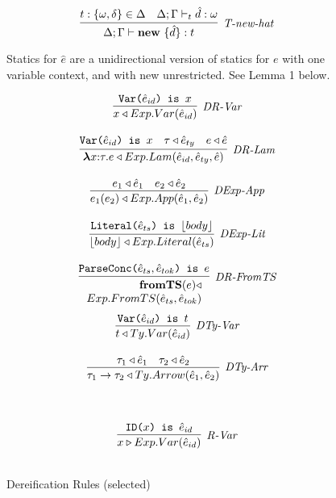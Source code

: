 \begin{figure}
\centering
\[
\infer[\textit{T-new-hat}]
	{\Delta; \Gamma \vdash \keyw{new}\ \{ \hat d \} :  t }
	{ t:\{\omega, \delta\} \in \Delta & \Delta; \Gamma \vdash_t \hat d : \omega}
\]
\vspace{-15px}
\caption{Statics for $\hat e$ are a unidirectional version of statics for $e$ with one variable context, and with new unrestricted. See Lemma 1 below.}
\vspace{-10px}
\label{fig:staticsHat}
\end{figure}

\begin{figure}[t]
\centering
\begin{minipage}[t]{.51\textwidth}
  \centering
   \[
\begin{array}{c}

\infer[\textit{DR-Var}]
	{ x \triangleleft Exp.Var(\hat{e}_{id})   }
	{ \texttt{Var($\hat{e}_{id}$) is $x$}} \\[3ex]

\infer[\textit{DR-Lam}]
	{ \boldsymbol\lambda x{:}\tau . e \triangleleft Exp.Lam( \hat{e}_{id}, \hat{e}_{ty}, \hat{e})  }
	{ \texttt{Var($\hat{e}_{id}$) is $x$} & \tau \triangleleft \hat{e}_{ty} & e \triangleleft \hat{e} } \\[3ex]

\infer[\textit{DExp-App}]
	{ e_1(e_2)  \triangleleft Exp.App(\hat{e}_1,\hat{e}_2) }
	{ e_1 \triangleleft \hat{e}_1  & e_2 \triangleleft \hat{e}_2   } \\[3ex]

\infer[\textit{DExp-Lit}]
	{ \lfloor body \rfloor \triangleleft Exp.Literal( \hat{e}_{ts} )  }
	{ \texttt{Literal($\hat{e}_{ts}$) is $\lfloor body \rfloor$}} \\[3ex]

\infer[\textit{DR-FromTS}]
          {\renewcommand{\arraystretch}{1}
	    \begin{array}{r}
	    \keyw{fromTS}(e) \triangleleft\\
            Exp.FromTS(\hat{e}_{ts},\hat{e}_{tok})
            \end{array}
       }
	  {\texttt{ParseConc($\hat{e}_{ts},\hat{e}_{tok}$) is $e$}}
	   \\[3ex] 

\infer[\textit{DTy-Var}]
	{ t \triangleleft Ty.Var(\hat{e}_{id})   }
	{ \texttt{Var($\hat{e}_{id}$) is $t$}} \\[3ex]

\infer[\textit{DTy-Arr}]
	{ \tau_1 \rightarrow \tau_2 \triangleleft Ty.Arrow(\hat{e}_1,\hat{e}_2 )  }
	{ \tau_1 \triangleleft \hat{e}_1 & \tau_2 \triangleleft \hat{e}_2 }
\end{array}
\]
\label{fig:dereification}
\vspace{-10px}
\caption{Dereification Rules (selected)}
\end{minipage}%
~\vline~
\begin{minipage}[t]{.44\textwidth}
  \centering
  \[
\begin{array}{c}
\infer[\textit{R-Var}]
	{ x \triangleright Exp.Var(\hat{e}_{id})   }
	{ \texttt{ID($x$) is $\hat{e}_{id}$}} \\[3ex]


\end{array}\]
\end{minipage}
\end{figure}
